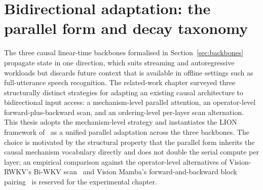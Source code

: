 \section{Bidirectional adaptation: the parallel form and decay taxonomy}\label{sec:lion}

The three causal linear-time backbones formalised in
Section~\ref{sec:backbones} propagate state in one direction, which
suits streaming and autoregressive workloads but discards future
context that is available in offline settings such as full-utterance
speech recognition. The related-work chapter surveyed three
structurally distinct strategies for adapting an existing causal
architecture to bidirectional input access: a mechanism-level
parallel attention, an operator-level forward-plus-backward scan, and
an ordering-level per-layer scan alternation. This thesis adopts the
mechanism-level strategy and instantiates the LION framework
of~\citet{afzal2025linear} as a unified parallel adaptation across
the three backbones. The choice is motivated by the structural
property that the parallel form inherits the causal mechanism
vocabulary directly and does not double the serial compute per layer;
an empirical comparison against the operator-level alternatives of
Vision-RWKV's Bi-WKV scan~\cite{duan2024visionrwkv} and Vision
Mamba's forward-and-backward block pairing~\cite{zhu2024visionmamba}
is reserved for the experimental chapter.

